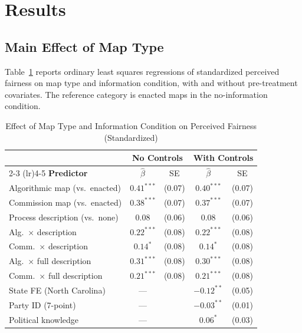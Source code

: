\section{Results}
\label{sec:results}

\subsection{Main Effect of Map Type}

Table~\ref{tab:main_results} reports ordinary least squares regressions of standardized perceived fairness on map type and information condition, with and without pre-treatment covariates. The reference category is enacted maps in the no-information condition.

\begin{table}[h!]
\centering
\caption{Effect of Map Type and Information Condition on Perceived Fairness (Standardized)}
\label{tab:main_results}
\begin{threeparttable}
\begin{tabular}{lcccc}
\toprule
 & \multicolumn{2}{c}{\textbf{No Controls}} & \multicolumn{2}{c}{\textbf{With Controls}} \\
\cmidrule(lr){2-3} \cmidrule(lr){4-5}
\textbf{Predictor} & $\hat{\beta}$ & SE & $\hat{\beta}$ & SE \\
\midrule
Algorithmic map (vs.\ enacted)   & $0.41^{***}$ & (0.07) & $0.40^{***}$ & (0.07) \\
Commission map (vs.\ enacted)    & $0.38^{***}$ & (0.07) & $0.37^{***}$ & (0.07) \\
Process description (vs.\ none)  & $0.08$       & (0.06) & $0.08$       & (0.06) \\
Alg.\ $\times$ description       & $0.22^{***}$ & (0.08) & $0.22^{***}$ & (0.08) \\
Comm.\ $\times$ description      & $0.14^{*}$   & (0.08) & $0.14^{*}$   & (0.08) \\
Alg.\ $\times$ full description  & $0.31^{***}$ & (0.08) & $0.30^{***}$ & (0.08) \\
Comm.\ $\times$ full description & $0.21^{***}$ & (0.08) & $0.21^{***}$ & (0.08) \\
\midrule
State FE (North Carolina)        & ---          &        & $-0.12^{**}$ & (0.05) \\
Party ID (7-point)               & ---          &        & $-0.03^{**}$ & (0.01) \\
Political knowledge              & ---          &        & $0.06^{*}$   & (0.03) \\

\end{tabular}
\end{threeparttable}
\end{table}

